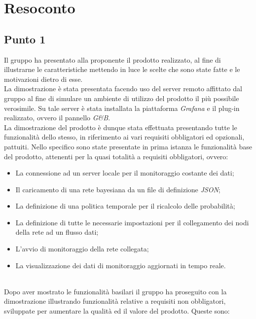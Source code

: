 \section{Resoconto}


\subsection{Punto 1}
Il gruppo ha presentato alla proponente il prodotto realizzato, al fine di illustrarne le caratteristiche mettendo in luce le scelte che sono state fatte e le motivazioni dietro di esse.\\
La dimostrazione è stata presentata facendo uso del server remoto affittato dal gruppo al fine di simulare un ambiente di utilizzo del prodotto il più possibile verosimile. Su tale server è stata installata la piattaforma \textit{Grafana} e il plug-in realizzato, ovvero il pannello \textit{G\&B}.\\
La dimostrazione del prodotto è dunque stata effettuata presentando tutte le funzionalità dello stesso, in riferimento ai vari requisiti obbligatori ed opzionali, pattuiti. Nello specifico sono state presentate in prima istanza le funzionalità base del prodotto, attenenti per la quasi totalità a requisiti obbligatori, ovvero: 
\begin{itemize}
 \item La connessione ad un server locale per il monitoraggio costante dei dati;
 \item Il caricamento di una rete bayesiana da un file di definizione \textit{JSON};
 \item La definizione di una politica temporale per il ricalcolo delle probabilità;
 \item La definizione di tutte le necessarie impostazioni per il collegamento dei nodi della rete ad un flusso dati;
 \item L'avvio di monitoraggio della rete collegata;
 \item La visualizzazione dei dati di monitoraggio aggiornati in tempo reale.
\end{itemize}
~\\
Dopo aver mostrato le funzionalità basilari il gruppo ha proseguito con la dimostrazione illustrando funzionalità relative a requisiti non obbligatori, sviluppate per aumentare la qualità ed il valore del prodotto. Queste sono:
